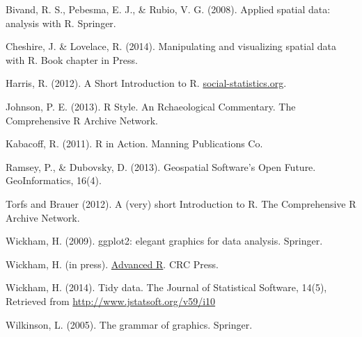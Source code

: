 \documentclass[]{article}
\begin{document}
Bivand, R. S., Pebesma, E. J., \& Rubio, V. G. (2008). Applied spatial
data: analysis with R. Springer.

Cheshire, J. \& Lovelace, R. (2014). Manipulating and visualizing
spatial data with R. Book chapter in Press.

Harris, R. (2012). A Short Introduction to R.
\href{http://www.social-statistics.org/}{social-statistics.org}.

Johnson, P. E. (2013). R Style. An Rchaeological Commentary. The
Comprehensive R Archive Network.

Kabacoff, R. (2011). R in Action. Manning Publications Co.

Ramsey, P., \& Dubovsky, D. (2013). Geospatial Software's Open Future.
GeoInformatics, 16(4).

Torfs and Brauer (2012). A (very) short Introduction to R. The
Comprehensive R Archive Network.

Wickham, H. (2009). ggplot2: elegant graphics for data analysis.
Springer.

Wickham, H. (in press). \href{http://adv-r.had.co.nz/}{Advanced R}. CRC
Press.

Wickham, H. (2014). Tidy data. The Journal of Statistical Software,
14(5), Retrieved from \url{http://www.jstatsoft.org/v59/i10}

Wilkinson, L. (2005). The grammar of graphics. Springer.
\end{document}
